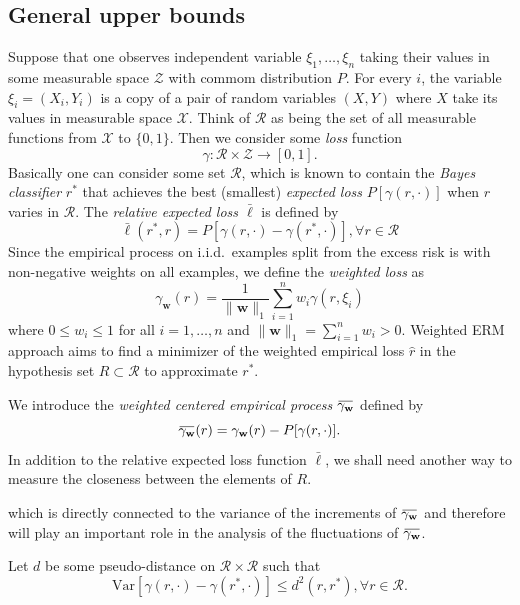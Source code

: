 \documentclass[letterpaper]{article} %
\def\LongVersion{}
\def\LongVersionEnd{}
\newcommand{\Pro}{P}
\newcommand{\Var}{\text{Var}}
\newcommand{\overbar}[1]{\mkern 1.5mu\overline{\mkern-1.5mu#1\mkern-1.5mu}\mkern 1.5mu}
\newcommand*\cen[1]{\overbar{#1}}
\newcommand{\weight}{\mathbf{w}}
\newcommand{\xspace}{\mathcal{X}}
\newcommand{\relossf}{\bar{\ell}}
\newcommand{\cenprocess}[1]{\cen{\gamma_{#1}}}
\newcommand{\normo}[1]{\|#1\|_1}
\begin{document}
\subsection{General upper bounds} %
\label{sub:i_i_d_}


Suppose that one observes independent variable $\xi_1,\dots,\xi_n$ taking their values in some measurable space $\mathcal Z$ with commom distribution $P$. 
For every $i$, the variable $\xi_i=(X_i,Y_i)$ is a copy of a pair of random variables $(X,Y)$ where $X$ take its values in measurable space $\xspace$. 
Think of $\mathcal{R}$ as being the set of all measurable functions from $\xspace$ to $\{0,1\}$. 
Then we consider some \emph{loss} function
\begin{equation}
    \label{eq:iid_loss}
    \gamma: \mathcal{R} \times \mathcal{Z} \to [0,1].
\end{equation}
Basically one can consider some set $\mathcal{R}$, which is known to contain the \emph{Bayes classifier} $r^*$ that achieves the best (smallest) \emph{expected loss} $P[\gamma(r,\cdot)]$ when $r$ varies in $\mathcal{R}$. The \emph{relative expected loss $\relossf$} is defined by
\begin{equation}
    \label{eq:iid_relative_expected_loss}
    \relossf(r^*,r) = \Pro[\gamma(r,\cdot)-\gamma(r^*,\cdot)], \forall r\in\mathcal{R}
\end{equation}
Since the empirical process on i.i.d.\ examples split from the excess risk is with non-negative weights on all examples, we define the \emph{weighted loss} as
\begin{equation}
    \label{eq:weighted_erm}
    \gamma_\weight(r) = \frac{1}{\normo{\weight{}}}\sum_{i=1}^n w_i\gamma(r,\xi_i)
\end{equation}
where $0\le w_i\le 1$ for all $i=1,\dots,n$ and $\normo{\weight{}}=\sum_{i=1}^n w_i> 0$. Weighted ERM approach aims to find a minimizer of the weighted empirical loss $\hat{r}$ in the hypothesis set $R\subset \mathcal{R}$ to approximate $r^*$.

We introduce the \emph{weighted centered empirical process} $\cenprocess{\weight}$ defined by
\begin{equation}
    \label{eq:centered_empirical_process}
    \cenprocess{\weight}(r) = \gamma_\weight(r)-\Pro[\gamma(r,\cdot)].
\end{equation}
In addition to the relative expected loss function $\relossf$, we shall need another way to measure the closeness between the elements of $R$.
\LongVersion
which is directly connected to the variance of the increments of $\cenprocess{\weight}$ and therefore will play an important role in the analysis of the fluctuations of $\cenprocess{\weight}$.
\LongVersionEnd
Let $d$ be some pseudo-distance on $\mathcal{R}\times\mathcal{R}$ such that
\begin{equation}
    \label{eq:variancD_Eistance_inequality}
    \Var[\gamma(r,\cdot)-\gamma(r^*,\cdot)]\le d^2(r,r^*), \forall r\in\mathcal{R}.
\end{equation}
\end{document}
